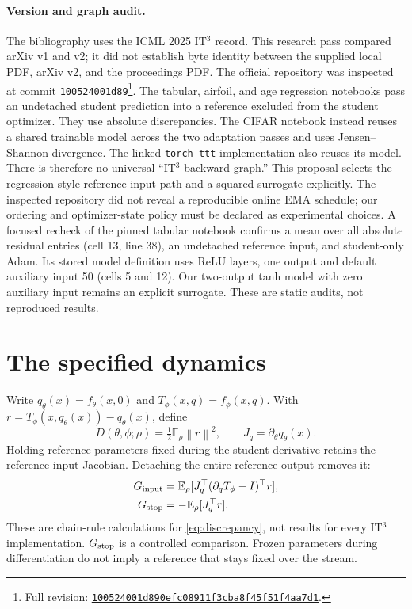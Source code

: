 \documentclass[11pt,a4paper]{article}
\newcommand{\E}{\mathbb{E}}
\newcommand{\norm}[1]{\left\lVert #1\right\rVert}
\begin{document}
\paragraph{Version and graph audit.}
The bibliography uses the ICML 2025 IT$^3$ record. This research pass compared
arXiv v1 and v2; it did not establish byte identity between the supplied
local PDF, arXiv v2, and the proceedings PDF. The official repository was
inspected at commit \texttt{100524001d89}\footnote{Full revision:
\href{https://github.com/nikitadurasov/ittt/tree/100524001d890efc08911f3cba8f45f51f4aa7d1}{\texttt{100524001d890efc08911f3cba8f45f51f4aa7d1}}.}.
The tabular, airfoil, and age regression notebooks pass an undetached student
prediction into a reference excluded from the student optimizer. They use
absolute discrepancies. The CIFAR notebook instead reuses a shared
trainable model across the two adaptation passes and uses Jensen--Shannon
divergence. The linked \texttt{torch-ttt} implementation also reuses its
model. There is therefore no universal ``IT$^3$ backward graph.'' This
proposal selects the regression-style reference-input path and a squared
surrogate explicitly. The inspected repository did not reveal a reproducible
online EMA schedule; our ordering and optimizer-state policy must be declared
as experimental choices. A focused recheck of the pinned tabular notebook
confirms a mean over all absolute residual entries (cell 13, line 38),
an undetached reference input, and student-only Adam. Its stored model
definition uses ReLU layers, one output and default auxiliary input 50
(cells 5 and 12). Our two-output tanh model with zero auxiliary input
remains an explicit surrogate. These are static audits, not reproduced results.

\section{The specified dynamics}
Write $q_\theta(x)=f_\theta(x,0)$ and $T_\phi(x,q)=f_\phi(x,q)$. With
$r=T_\phi(x,q_\theta(x))-q_\theta(x)$, define
\begin{equation}
 D(\theta,\phi;\rho)=\tfrac12\E_\rho\norm{r}^2,
 \qquad J_q=\partial_\theta q_\theta(x).
 \label{eq:discrepancy}
\end{equation}
Holding reference parameters fixed during the student derivative retains
the reference-input Jacobian. Detaching the entire reference output removes it:
\begin{align}
 G_{\rm input}&=\E_\rho[J_q^\top(\partial_qT_\phi-I)^\top r],
 \label{eq:input}\\
 G_{\rm stop}&=-\E_\rho[J_q^\top r].
 \label{eq:stop}
\end{align}
These are chain-rule calculations for \eqref{eq:discrepancy}, not results
for every IT$^3$ implementation. $G_{\rm stop}$ is a controlled comparison.
Frozen parameters during differentiation do not imply a reference that
stays fixed over the stream.
\end{document}
